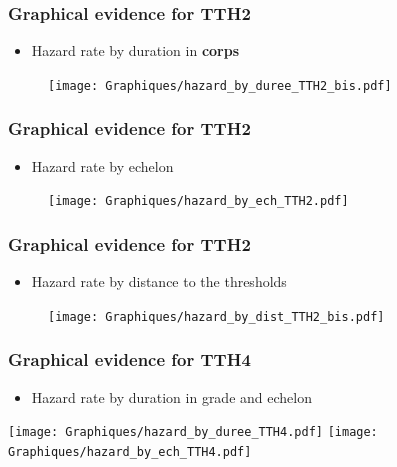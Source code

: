 \documentclass[xcolor=table,ignorenonframetext,12pt]{beamer}
\begin{document}
\begin{frame}
\frametitle{Graphical evidence for TTH2}
\begin{itemize}
	\item Hazard rate by duration in \textbf{corps}
\end{itemize}
\vspace{-0.2cm}
\begin{center}
\begin{figure}
\texttt{[image: Graphiques/hazard\_by\_duree\_TTH2\_bis.pdf]}
\end{figure}
\end{center}
\end{frame}



\begin{frame}
\frametitle{Graphical evidence for TTH2}
\begin{itemize}
	\item Hazard rate by echelon
\end{itemize}
\vspace{-0.2cm}
\begin{center}
\begin{figure}
\texttt{[image: Graphiques/hazard\_by\_ech\_TTH2.pdf]}
\end{figure}
\end{center}
\end{frame}


\begin{frame}
\frametitle{Graphical evidence for TTH2}
\begin{itemize}
	\item Hazard rate by distance to the thresholds
\end{itemize}
\vspace{-0.2cm}
\begin{center}
\begin{figure}
\texttt{[image: Graphiques/hazard\_by\_dist\_TTH2\_bis.pdf]}
\end{figure}
\end{center}
\end{frame}


\begin{frame}
\frametitle{Graphical evidence for TTH4}
\begin{itemize}
	\item Hazard rate by duration in grade and echelon
\end{itemize}
\begin{center}
	\texttt{[image: Graphiques/hazard\_by\_duree\_TTH4.pdf]}
	\texttt{[image: Graphiques/hazard\_by\_ech\_TTH4.pdf]}
\end{center}
\end{frame}
\end{document}
